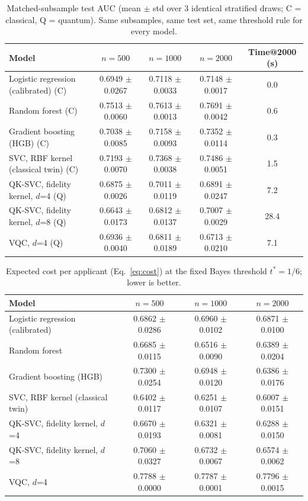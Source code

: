 \documentclass[11pt]{article}
\begin{document}
\begin{table}[t]
\centering\small
\caption{Matched-subsample test AUC (mean $\pm$ std over 3 identical
stratified draws; C = classical, Q = quantum). Same subsamples, same test
set, same threshold rule for every model.}
\label{tab:matched}
\begin{tabular}{lcccc}
\toprule
Model & $n=500$ & $n=1000$ & $n=2000$ & Time@2000 (s) \\
\midrule
Logistic regression (calibrated) (C) & 0.6949 $\pm$ 0.0267 & 0.7118 $\pm$ 0.0033 & 0.7148 $\pm$ 0.0017 & 0.0 \\
Random forest (C) & 0.7513 $\pm$ 0.0060 & 0.7613 $\pm$ 0.0013 & 0.7691 $\pm$ 0.0042 & 0.6 \\
Gradient boosting (HGB) (C) & 0.7038 $\pm$ 0.0085 & 0.7158 $\pm$ 0.0093 & 0.7352 $\pm$ 0.0114 & 0.3 \\
SVC, RBF kernel (classical twin) (C) & 0.7193 $\pm$ 0.0070 & 0.7368 $\pm$ 0.0038 & 0.7486 $\pm$ 0.0051 & 1.5 \\
QK-SVC, fidelity kernel, $d$=4 (Q) & 0.6875 $\pm$ 0.0026 & 0.7011 $\pm$ 0.0119 & 0.6891 $\pm$ 0.0247 & 7.2 \\
QK-SVC, fidelity kernel, $d$=8 (Q) & 0.6643 $\pm$ 0.0173 & 0.6812 $\pm$ 0.0137 & 0.7007 $\pm$ 0.0029 & 28.4 \\
VQC, $d$=4 (Q) & 0.6936 $\pm$ 0.0040 & 0.6811 $\pm$ 0.0189 & 0.6713 $\pm$ 0.0210 & 7.1 \\
\bottomrule
\end{tabular}
\end{table}

\begin{table}[t]
\centering\small
\caption{Expected cost per applicant (Eq.~\ref{eq:cost}) at the fixed Bayes
threshold $t^\ast = 1/6$; lower is better.}
\label{tab:cost}
\begin{tabular}{lccc}
\toprule
Model & $n=500$ & $n=1000$ & $n=2000$ \\
\midrule
Logistic regression (calibrated) & 0.6862 $\pm$ 0.0286 & 0.6960 $\pm$ 0.0102 & 0.6871 $\pm$ 0.0100 \\
Random forest & 0.6685 $\pm$ 0.0115 & 0.6516 $\pm$ 0.0090 & 0.6389 $\pm$ 0.0204 \\
Gradient boosting (HGB) & 0.7300 $\pm$ 0.0254 & 0.6948 $\pm$ 0.0120 & 0.6386 $\pm$ 0.0176 \\
SVC, RBF kernel (classical twin) & 0.6402 $\pm$ 0.0117 & 0.6251 $\pm$ 0.0107 & 0.6007 $\pm$ 0.0151 \\
QK-SVC, fidelity kernel, $d$=4 & 0.6670 $\pm$ 0.0193 & 0.6321 $\pm$ 0.0081 & 0.6288 $\pm$ 0.0150 \\
QK-SVC, fidelity kernel, $d$=8 & 0.7060 $\pm$ 0.0327 & 0.6732 $\pm$ 0.0067 & 0.6574 $\pm$ 0.0062 \\
VQC, $d$=4 & 0.7788 $\pm$ 0.0000 & 0.7787 $\pm$ 0.0001 & 0.7796 $\pm$ 0.0015 \\
\bottomrule
\end{tabular}
\end{table}
\end{document}

